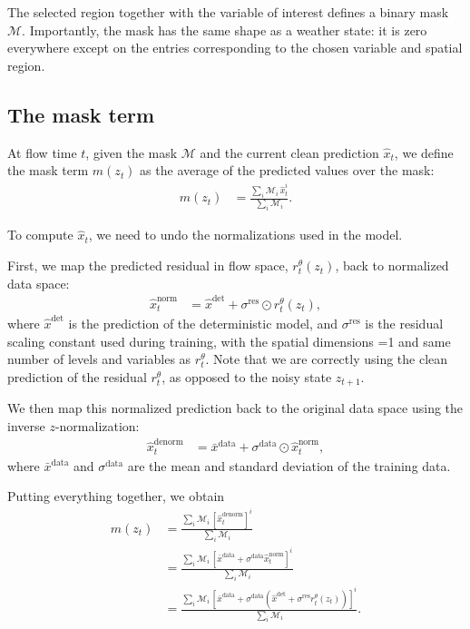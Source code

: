 \documentclass[a4paper,12pt]{article}
\begin{document}
The selected region together with the variable of interest defines a binary mask $\mathcal{M}$.
Importantly, the mask has the same shape as a weather state: it is zero everywhere except on the entries corresponding to the chosen variable and spatial region.

\subsection{The mask term}

At flow time $t$, given the mask $\mathcal{M}$ and the current clean prediction $\hat{x}_t$, we define the mask term $m(z_t)$ as the average of the predicted values over the mask:
\begin{align*} 
    m(z_t) &= \frac{\sum_i \mathcal{M}_i \, \hat{x}_t^i}{\sum_i \mathcal{M}_i}.
\end{align*}

To compute $\hat{x}_t$, we need to undo the normalizations used in the model.

First, we map the predicted residual in flow space, $r_t^\theta(z_t)$, back to normalized data space:
\begin{align*} 
    \hat{x}^{\text{norm}}_t &= \hat{x}^{\text{det}} + \sigma^{\text{res}} \odot r_t^\theta(z_t),
\end{align*}
where $\hat{x}^{\text{det}}$ is the prediction of the deterministic model, and $\sigma^{\text{res}}$ is the residual scaling constant used during training, with the spatial dimensions =1 and same number of levels and variables as $r_t^\theta$.
Note that we are correctly using the clean prediction of the residual $r_t^\theta$, as opposed to the noisy state $z_{t+1}$. 

We then map this normalized prediction back to the original data space using the inverse $z$-normalization:
\begin{align*} 
    \hat{x}^{\text{denorm}}_t &= \bar{x}^{\text{data}} + \sigma^{\text{data}} \odot \hat{x}^{\text{norm}}_t,
\end{align*}
where $\bar{x}^{\text{data}}$ and $\sigma^{\text{data}}$ are the mean and standard deviation of the training data.

Putting everything together, we obtain
\begin{align*} 
    m(z_t) &= \frac{\sum_i \mathcal{M}_i \, [\hat{x}^{\text{denorm}}_t]^i}{\sum_i \mathcal{M}_i} \\
    &= \frac{\sum_i \mathcal{M}_i \, [\bar{x}^{\text{data}} + \sigma^{\text{data}} \hat{x}^{\text{norm}}_t]^i}{\sum_i \mathcal{M}_i} \\
    &= \frac{\sum_i \mathcal{M}_i \, [\bar{x}^{\text{data}} + \sigma^{\text{data}}(\hat{x}^{\text{det}} + \sigma^{\text{res}} r_t^\theta(z_t))]^i}{\sum_i \mathcal{M}_i}.
\end{align*}
\end{document}

